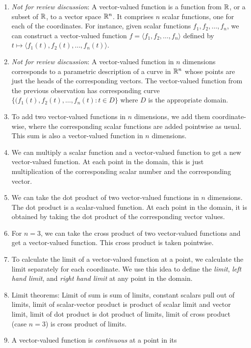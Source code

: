 \documentclass[10pt]{amsart}
\begin{document}
\begin{enumerate}
\item {\em Not for review discussion}: A vector-valued function is a
  function from $\mathbb{R}$, or a subset of $\mathbb{R}$, to a vector space
  $\mathbb{R}^n$. It comprises $n$ scalar functions, one for each of the
  coordinates. For instance, given scalar functions $f_1, f_2, \dots,
  f_n$, we can construct a vector-valued function $f = \langle f_1,
  f_2, \dots, f_n \rangle$ defined by $t \mapsto \langle f_1(t),
  f_2(t), \dots, f_n(t) \rangle$.
\item {\em Not for review discussion}: A vector-valued function in $n$
  dimensions corresponds to a parametric description of a curve in
  $\mathbb{R}^n$ whose points are just the heads of the corresponding
  vectors. The vector-valued function from the previous observation
  has corresponding curve $\{ (f_1(t),f_2(t),\dots,f_n(t): t \in D \}$
  where $D$ is the appropriate domain.
\item To add two vector-valued functions in $n$ dimensions, we add
  them coordinate-wise, where the corresponding scalar functions are
  added pointwise as usual. This sum is also a vector-valued function
  in $n$ dimensions.
\item We can multiply a scalar function and a vector-valued function
  to get a new vector-valued function. At each point in the domain,
  this is just multiplication of the corresponding scalar number and
  the corresponding vector.
\item We can take the dot product of two vector-valued functions in
  $n$ dimensions. The dot product is a scalar-valued function. At each
  point in the domain, it is obtained by taking the dot product of the
  corresponding vector values.
\item For $n = 3$, we can take the cross product of two vector-valued
  functions and get a vector-valued function. This cross product is
  taken pointwise.
\item To calculate the limit of a vector-valued function at a point,
  we calculate the limit separately for each coordinate. We use this
  idea to define the {\em limit}, {\em left hand limit}, and {\em
  right hand limit} at any point in the domain.
\item Limit theorems: Limit of sum is sum of limits, constant scalars
  pull out of limits, limit of scalar-vector product is product of
  scalar limit and vector limit, limit of dot product is dot product
  of limits, limit of cross product (case $n = 3$) is cross product of limits.
\item A vector-valued function is {\em continuous} at a point in its

\end{enumerate}
\end{document}
